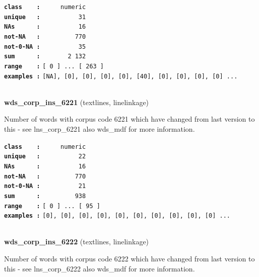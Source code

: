 \documentclass[]{article}
\begin{document}
\textbf{\texttt{class\ \ \ \ :}} \texttt{~~~~~numeric}\\
\textbf{\texttt{unique\ \ \ :}} \texttt{~~~~~~~~~~31}\\
\textbf{\texttt{NAs\ \ \ \ \ \ :}} \texttt{~~~~~~~~~~16}\\
\textbf{\texttt{not-NA\ \ \ :}} \texttt{~~~~~~~~~770}\\
\textbf{\texttt{not-0-NA\ :}} \texttt{~~~~~~~~~~35}\\
\textbf{\texttt{sum\ \ \ \ \ \ :}} \texttt{~~~~~~~2~132}\\
\textbf{\texttt{range\ \ \ \ :}}
\texttt{{[}\ 0\ {]}\ ...\ {[}\ 263\ {]}}\\
\textbf{\texttt{examples\ :}}
\texttt{{[}NA{]},\ {[}0{]},\ {[}0{]},\ {[}0{]},\ {[}0{]},\ {[}40{]},\ {[}0{]},\ {[}0{]},\ {[}0{]},\ {[}0{]}\ ...}\\

~

\textbf{wds\_corp\_ins\_6221} (textlines, linelinkage)

Number of words with corpus code 6221 which have changed from last
version to this - see lns\_corp\_6221 also wds\_mdf for more
information.

\textbf{\texttt{class\ \ \ \ :}} \texttt{~~~~~numeric}\\
\textbf{\texttt{unique\ \ \ :}} \texttt{~~~~~~~~~~22}\\
\textbf{\texttt{NAs\ \ \ \ \ \ :}} \texttt{~~~~~~~~~~16}\\
\textbf{\texttt{not-NA\ \ \ :}} \texttt{~~~~~~~~~770}\\
\textbf{\texttt{not-0-NA\ :}} \texttt{~~~~~~~~~~21}\\
\textbf{\texttt{sum\ \ \ \ \ \ :}} \texttt{~~~~~~~~~938}\\
\textbf{\texttt{range\ \ \ \ :}}
\texttt{{[}\ 0\ {]}\ ...\ {[}\ 95\ {]}}\\
\textbf{\texttt{examples\ :}}
\texttt{{[}0{]},\ {[}0{]},\ {[}0{]},\ {[}0{]},\ {[}0{]},\ {[}0{]},\ {[}0{]},\ {[}0{]},\ {[}0{]},\ {[}0{]}\ ...}\\

~

\textbf{wds\_corp\_ins\_6222} (textlines, linelinkage)

Number of words with corpus code 6222 which have changed from last
version to this - see lns\_corp\_6222 also wds\_mdf for more
information.
\end{document}
